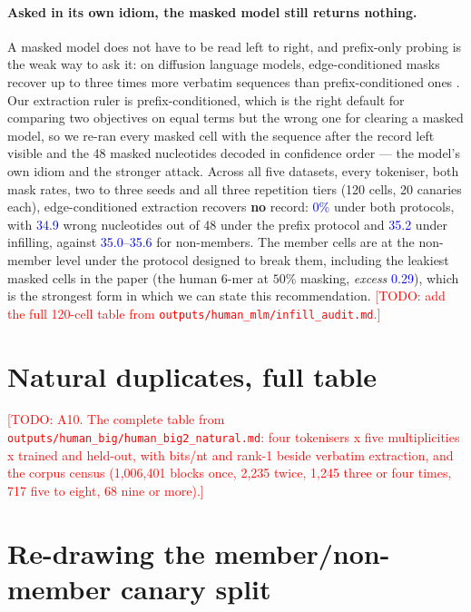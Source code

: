 \documentclass[10pt,letterpaper]{article}
\newcommand{\TODO}[1]{\textcolor{red}{[TODO: #1]}}
\newcommand{\NUM}[1]{\textcolor{blue}{#1}}
\newcommand{\excess}{\textit{excess}}
\newcommand{\kmer}[1]{#1-mer}
\begin{document}
\paragraph{Asked in its own idiom, the masked model still returns nothing.}
A masked model does not have to be read left to right, and prefix-only probing is the weak way to
ask it: on diffusion language models, edge-conditioned masks recover up to three times more verbatim
sequences than prefix-conditioned ones \cite{wang2026infilling}. Our extraction ruler is
prefix-conditioned, which is the right default for comparing two objectives on equal terms but the
wrong one for clearing a masked model, so we re-ran every masked cell with the sequence after the
record left visible and the 48 masked nucleotides decoded in confidence order --- the model's own
idiom and the stronger attack. Across all five datasets, every tokeniser, both mask rates, two to
three seeds and all three repetition tiers (120 cells, 20 canaries each), edge-conditioned
extraction recovers \textbf{no} record: \NUM{0\%} under both protocols, with \NUM{34.9} wrong
nucleotides out of 48 under the prefix protocol and \NUM{35.2} under infilling, against
\NUM{35.0}--\NUM{35.6} for non-members. The member cells are at the non-member level under the
protocol designed to break them, including the leakiest masked cells in the paper (the human
\kmer{6} at $50\%$ masking, \excess{} \NUM{0.29}), which is the strongest form in which we can state
this recommendation.
\TODO{add the full 120-cell table from \texttt{outputs/human\_mlm/infill\_audit.md}.}

\section{Natural duplicates, full table}
\TODO{A10. The complete table from \texttt{outputs/human\_big/human\_big2\_natural.md}: four
tokenisers x five multiplicities x trained and held-out, with bits/nt and rank-1 beside verbatim
extraction, and the corpus census (1{,}006{,}401 blocks once, 2{,}235 twice, 1{,}245 three or four
times, 717 five to eight, 68 nine or more).}

\section{Re-drawing the member/non-member canary split}
\end{document}
